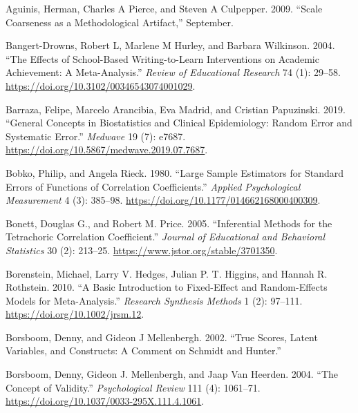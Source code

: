 \documentclass[
  letterpaper,
  DIV=11,
  numbers=noendperiod]{scrreprt}
\newlength{\cslhangindent}
\newlength{\cslentryspacingunit} %
\newenvironment{CSLReferences}[2] %
 {%
  \setlength{\parindent}{0pt}
  \ifodd #1
  \let\oldpar\par
  \def\par{\hangindent=\cslhangindent\oldpar}
  \fi
  \setlength{\parskip}{#2\cslentryspacingunit}
 }%
 {}
\begin{document}

\hypertarget{refs}{}
\begin{CSLReferences}{1}{0}
\leavevmode{}%
Aguinis, Herman, Charles A Pierce, and Steven A Culpepper. 2009.
{``Scale Coarseness as a Methodological Artifact,''} September.

\leavevmode{}%
Bangert-Drowns, Robert L, Marlene M Hurley, and Barbara Wilkinson. 2004.
{``The Effects of School-Based Writing-to-Learn Interventions on
Academic Achievement: A Meta-Analysis.''} \emph{Review of Educational
Research} 74 (1): 29--58.
\url{https://doi.org/10.3102/00346543074001029}.

\leavevmode{}%
Barraza, Felipe, Marcelo Arancibia, Eva Madrid, and Cristian Papuzinski.
2019. {``General Concepts in Biostatistics and Clinical Epidemiology:
Random Error and Systematic Error.''} \emph{Medwave} 19 (7): e7687.
\url{https://doi.org/10.5867/medwave.2019.07.7687}.

\leavevmode{}%
Bobko, Philip, and Angela Rieck. 1980. {``Large Sample Estimators for
Standard Errors of Functions of Correlation Coefficients.''}
\emph{Applied Psychological Measurement} 4 (3): 385--98.
\url{https://doi.org/10.1177/014662168000400309}.

\leavevmode{}%
Bonett, Douglas G., and Robert M. Price. 2005. {``Inferential Methods
for the Tetrachoric Correlation Coefficient.''} \emph{Journal of
Educational and Behavioral Statistics} 30 (2): 213--25.
\url{https://www.jstor.org/stable/3701350}.

\leavevmode{}%
Borenstein, Michael, Larry V. Hedges, Julian P. T. Higgins, and Hannah
R. Rothstein. 2010. {``A Basic Introduction to Fixed-Effect and
Random-Effects Models for Meta-Analysis.''} \emph{Research Synthesis
Methods} 1 (2): 97--111. \url{https://doi.org/10.1002/jrsm.12}.

\leavevmode{}%
Borsboom, Denny, and Gideon J Mellenbergh. 2002. {``True Scores, Latent
Variables, and Constructs: A Comment on Schmidt and Hunter.''}

\leavevmode{}%
Borsboom, Denny, Gideon J. Mellenbergh, and Jaap Van Heerden. 2004.
{``The Concept of Validity.''} \emph{Psychological Review} 111 (4):
1061--71. \url{https://doi.org/10.1037/0033-295X.111.4.1061}.


\end{CSLReferences}
\end{document}
